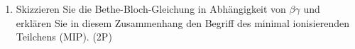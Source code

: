 \begin{enumerate}
  \item Skizzieren Sie die Bethe-Bloch-Gleichung in Abhängigkeit von $\beta\gamma$ und erklären Sie in diesem Zusammenhang den Begriff des minimal ionisierenden Teilchens (MIP). (2P)
  \end{enumerate}